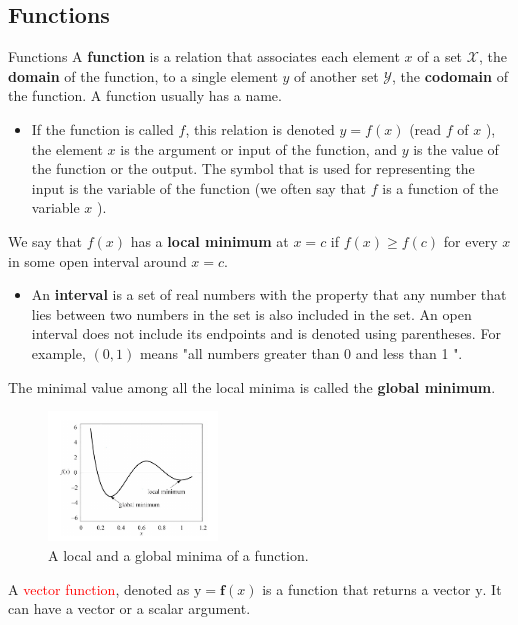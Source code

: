 \documentclass[9pt,dvipsnames]{beamer}
\begin{document}
\subsection{Functions}
\begin{frame}{Functions}
	A \textbf{function} is a relation that associates each element $x$ of a set $\mathcal{X}$, the \textbf{domain} of the function, to a single element $y$ of another set $\mathcal{Y}$, the \textbf{codomain} of the function. A function usually has a name.
	\begin{itemize}
		\item 	If the function is called $f$, this relation is denoted $y=f(x)$ (read $f$ of $x$ ), the element $x$ is the argument or input of the function, and $y$ is the value of the function or the output. The symbol that is used for representing the input is the variable of the function (we often say that $f$ is a function of the variable $x$ ).
	\end{itemize}
\end{frame}

\begin{frame}
	We say that $f(x)$ has a \textbf{local minimum} at $x=c$ if $f(x) \geq f(c)$ for every $x$ in some open interval around $x=c$.
	\begin{itemize}
		\item An \textbf{interval} is a set of real numbers with the property that any number that lies between two numbers in the set is also included in the set. An open interval does not include its endpoints and is denoted using parentheses. For example, $(0,1)$ means "all numbers greater than 0 and less than 1 ".
	\end{itemize}
	The minimal value among all the local minima is called the \textbf{global minimum}.
	\begin{figure}
		\centering
		\includegraphics[width=0.4\textwidth]{imgs/notation_2}
		\caption{A local and a global minima of a function.}
	\end{figure}
	A \textcolor{red}{vector function}, denoted as $\mathrm{y}=\boldsymbol{f}(x)$ is a function that returns a vector $\mathrm{y}$. It can have a vector or a scalar argument.
\end{frame}
\end{document}
